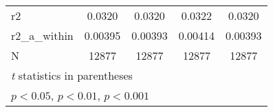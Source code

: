 {\begin{tabular}{l*{4}{c}}
\hline
r2          &      0.0320         &      0.0320         &      0.0322         &      0.0320         \\
r2\_a\_within &     0.00395         &     0.00393         &     0.00414         &     0.00393         \\
N           &       12877         &       12877         &       12877         &       12877         \\
\hline\hline
\multicolumn{5}{l}{\footnotesize \textit{t} statistics in parentheses}\\
\multicolumn{5}{l}{\footnotesize \sym{*} \(p<0.05\), \sym{**} \(p<0.01\), \sym{***} \(p<0.001\)}\\
\end{tabular}
}
